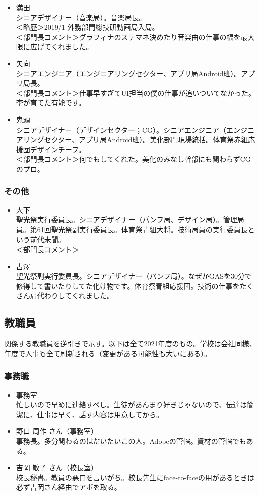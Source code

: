 \documentclass[dvipdfmx,jb5]{jarticle}
\begin{document}
\begin{itemize}
  \item 満田\\
  シニアデザイナー（音楽局）。音楽局長。\\
  ＜略歴＞2019/1 外務部門総技研動画局入局。\\
  ＜部門長コメント＞グラフィナのステマネ決めたり音楽曲の仕事の幅を最大限に広げてくれました。
  \item 矢向\\
  シニアエンジニア（エンジニアリングセクター、アプリ局Android班）。アプリ局長。\\
  ＜部門長コメント＞仕事早すぎてUI担当の僕の仕事が追いついてなかった。李が育てた有能です。
  \item 鬼頭\\
  シニアデザイナー（デザインセクター；CG）。シニアエンジニア（エンジニアリングセクター、アプリ局Android班）。美化部門現場統括。体育祭赤組応援団デザインチーフ。\\
  ＜部門長コメント＞何でもしてくれた。美化のみなし幹部にも関わらずCGのプロ。
\end{itemize}
\subsubsection{その他}
\begin{itemize}
  \item 大下\\
  聖光祭実行委員長。シニアデザイナー（パンフ局、デザイン局）。管理局員。第61回聖光祭副実行委員長。体育祭青組大将。技術局員の実行委員長という前代未聞。\\
  ＜部門長コメント＞
  \item 古澤\\
  聖光祭副実行委員長。シニアデザイナー（パンフ局）。なぜかGASを30分で修得して書いたりしてた化け物です。体育祭青組応援団。技術の仕事をたくさん肩代わりしてくれました。
\end{itemize}
\subsection{教職員}
関係する教職員を逆引きで示す。以下は全て2021年度のもの。学校は会社同様、年度で人事も全て刷新される（変更がある可能性も大いにある）。
\subsubsection{事務職}
\begin{itemize}
  \item 事務室\\
  忙しいので早めに連絡すべし。生徒があんまり好きじゃないので、伝達は簡潔に、仕事は早く、話す内容は用意してから。
  \item 野口 周作 さん（事務室）\\
  事務長。多分関わるのはだいたいこの人。Adobeの管轄。資材の管轄でもある。
  \item 吉岡 敏子 さん（校長室）\\
  校長秘書。教員の悪口を言いがち。校長先生にface-to-faceの用があるときは必ず吉岡さん経由でアポを取る。
\end{itemize}
\end{document}
